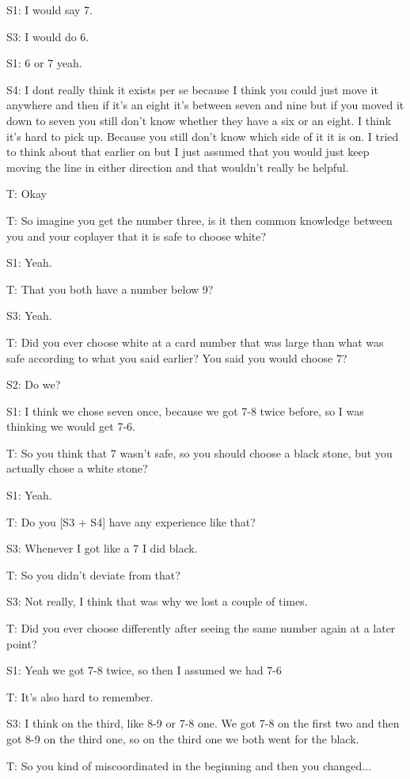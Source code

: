 \documentclass[a4paper,superscriptaddress,nofootinbib]{revtex4}
\begin{document}
S1: I would say 7.

S3: I would do 6.

S1: 6 or 7 yeah.

S4: I dont really think it exists per se because I think you could just move it anywhere and then if it's an eight it's between seven and nine but if you moved it down to seven you still don't know whether they have a six or an eight. I think it's hard to pick up. Because you still don't know which side of it it is on. I tried to think about that earlier on but I just assumed that you would just keep moving the line in either direction and that wouldn't really be helpful.

T: Okay

T: So imagine you get the number three, is it then common knowledge between you and your coplayer that it is safe to choose white?

S1: Yeah.

T: That you both have a number below 9?

S3: Yeah.

T: Did you ever choose white at a card number that was large than what was safe according to what you said earlier? You said you would choose 7?

S2: Do we?

S1: I think we chose seven once, because we got 7-8 twice before, so I was thinking we would get 7-6.

T: So you think that 7 wasn't safe, so you should choose a black stone, but you actually chose a white stone?

S1: Yeah.

T: Do you [S3 + S4] have any experience like that?

S3: Whenever I got like a 7 I did black.

T: So you didn't deviate from that?

S3: Not really, I think that was why we lost a couple of times.

T: Did you ever choose differently after seeing the same number again at a later point?

S1: Yeah we got 7-8 twice, so then I assumed we had 7-6

T: It's also hard to remember.

S3: I think on the third, like 8-9 or 7-8 one. We got 7-8 on the first two and then got 8-9 on the third one, so on the third one we both went for the black.

T: So you kind of miscoordinated in the beginning and then you changed...
\end{document}
